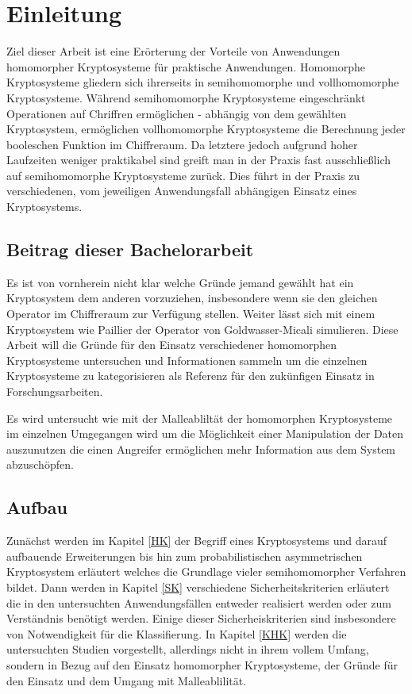 \chapter{Einleitung}

Ziel dieser Arbeit ist eine Erörterung der Vorteile von Anwendungen homomorpher Kryptosysteme für praktische Anwendungen. Homomorphe Kryptosysteme gliedern sich ihrerseits in semihomomorphe und vollhomomorphe Kryptosysteme. Während semihomomorphe Kryptosysteme eingeschränkt Operationen auf Chriffren ermöglichen - abhängig von dem gewählten Kryptosystem, ermöglichen vollhomomorphe Kryptosysteme die Berechnung jeder booleschen Funktion im Chiffreraum. Da letztere jedoch aufgrund hoher Laufzeiten weniger praktikabel sind greift man in der Praxis fast ausschließlich auf semihomomorphe Kryptosysteme zurück. Dies führt in der Praxis zu verschiedenen, vom jeweiligen Anwendungsfall abhängigen Einsatz eines Kryptosystems.

\section{Beitrag dieser Bachelorarbeit}

Es ist von vornherein nicht klar welche Gründe jemand gewählt hat ein Kryptosystem dem anderen vorzuziehen, insbesondere wenn sie den gleichen Operator im Chiffreraum zur Verfügung stellen. Weiter lässt sich mit einem Kryptosystem wie Paillier der Operator von Goldwasser-Micali simulieren. Diese Arbeit will die Gründe für den Einsatz verschiedener homomorphen Kryptosysteme untersuchen und Informationen sammeln um die einzelnen Kryptosysteme zu kategorisieren als Referenz für den zukünfigen Einsatz in Forschungsarbeiten.

Es wird untersucht wie mit der Malleabliltät der homomorphen Kryptosysteme im einzelnen Umgegangen wird um die Möglichkeit einer Manipulation der Daten auszunutzen die einen Angreifer ermöglichen mehr Information aus dem System abzuschöpfen. 

\section{Aufbau}

Zunächst werden im Kapitel \ref{HK} der Begriff eines Kryptosystems und darauf aufbauende Erweiterungen bis hin zum probabilistischen asymmetrischen Kryptosystem erläutert welches die Grundlage vieler semihomomorpher Verfahren bildet. Dann werden in Kapitel \ref{SK} verschiedene Sicherheitskriterien erläutert die in den untersuchten Anwendungsfällen entweder realisiert werden oder zum Verständnis benötigt werden. Einige dieser Sicherheiskriterien sind insbesondere von Notwendigkeit für die Klassifierung. In Kapitel \ref{KHK} werden die untersuchten Studien vorgestellt, allerdings nicht in ihrem vollem Umfang, sondern in Bezug auf den Einsatz homomorpher Kryptosysteme, der Gründe für den Einsatz und dem Umgang mit Malleablilität.
